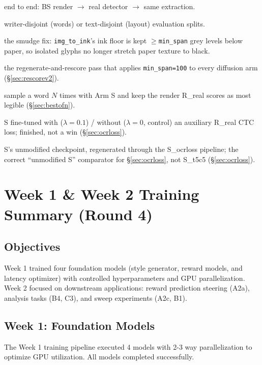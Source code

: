 \documentclass[10.5pt,a4paper]{article}
\begin{document}
\begin{description}[style=nextline,leftmargin=2.8cm,labelwidth=2.6cm]
\item[e2e] end to end: BS render $\to$ real detector $\to$ same extraction.
\item[VAL / TEST] writer-disjoint (words) or text-disjoint (layout) evaluation splits.
\item[\texttt{min\_span}] the smudge fix: \texttt{img\_to\_ink}'s ink floor is kept $\ge$\texttt{min\_span} grey levels below
  paper, so isolated glyphs no longer stretch paper texture to black.
\item[rescore\_v2] the regenerate-and-rescore pass that applies \texttt{min\_span=100} to every diffusion arm (\S\ref{sec:rescorev2}).
\item[best-of-$N$] sample a word $N$ times with Arm S and keep the render R\_real scores as most legible (\S\ref{sec:bestofn}).
\item[S\_ocrloss / S\_ft0] S fine-tuned with ($\lambda=0.1$) / without ($\lambda=0$, control) an auxiliary R\_real CTC loss;
  finished, not a win (\S\ref{sec:ocrloss}).
\item[S\_regen] S's unmodified checkpoint, regenerated through the S\_ocrloss pipeline; the correct ``unmodified S''
  comparator for \S\ref{sec:ocrloss}, not S\_t5c5 (\S\ref{sec:ocrloss}).
\end{description}


\section{Week 1 \& Week 2 Training Summary (Round 4)}
\label{sec:week12_training}

\subsection{Objectives}

Week 1 trained four foundation models (style generator, reward models, and latency optimizer) with controlled hyperparameters and GPU parallelization. Week 2 focused on downstream applications: reward prediction steering (A2a), analysis tasks (B4, C3), and sweep experiments (A2c, B1).

\subsection{Week 1: Foundation Models}

The Week 1 training pipeline executed 4 models with 2-3 way parallelization to optimize GPU utilization. All models completed successfully.
\end{document}
